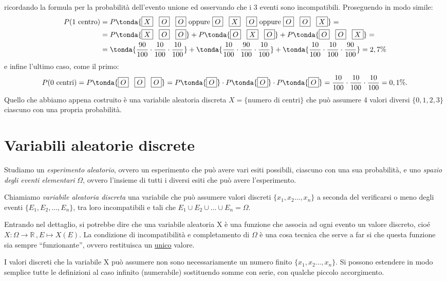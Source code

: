  ricordando la formula per la probabilità dell'evento unione ed osservando che i 3 eventi sono incompatibili. Proseguendo in modo simile:
 \[ \begin{split} P(\text{1 centro})&= P\tonda{\text{\boxed{X} \, \boxed{O} \, \boxed{O}} \text{ oppure } \text{\boxed{O} \, \boxed{X} \, \boxed{O}} \text{ oppure } \text{\boxed{O} \, \boxed{O} \, \boxed{X}}} =\\ &= 
P\tonda{\text{\boxed{X} \, \boxed{O} \, \boxed{O}}} +P\tonda{\text{\boxed{O} \, \boxed{X} \, \boxed{O}}} + P\tonda{ \text{\boxed{O} \, \boxed{O} \, \boxed{X}}} =\\ &=
 \tonda{\dfrac{90}{100} \cdot \dfrac{10}{100}  \cdot \dfrac{10}{100}}+ \tonda{\dfrac{10}{100} \cdot \dfrac{90}{100}  \cdot \dfrac{10}{100}}+ \tonda{\dfrac{10}{100} \cdot \dfrac{10}{100}  \cdot \dfrac{90}{100} } = 2,7 \%  \end{split}\]
 e infine l'ultimo caso, come il primo:
\[ P(\text{0 centri})= P\tonda{\text{\boxed{O} \, \boxed{O} \, \boxed{O}}} = P \tonda{\text{\boxed{O}}} \cdot P \tonda{\text{\boxed{O}}} \cdot P \tonda{\text{\boxed{O}}} = \dfrac{10}{100} \cdot \dfrac{10}{100}  \cdot \dfrac{10}{100}   = 
0,1\%. \]
Quello che abbiamo appena costruito è una variabile aleatoria discreta \(X = \{\text{numero di centri}\}\) che può assumere 4 valori diversi \(\{0,1,2,3\}\) ciascuno con una propria probabilità.

\section{Variabili aleatorie discrete}
\label{sec:01_discrete}

Studiamo un \emph{esperimento aleatorio}, ovvero un esperimento che può avere vari esiti possibili, ciascuno con una sua probabilità, e uno \emph{spazio degli eventi elementari} \(\Omega\), ovvero l'insieme di tutti i diversi esiti che può avere l'esperimento.

\begin{definizione} Chiamiamo \emph{variabile aleatoria discreta} una variabile che può assumere valori discreti \(\{x_1,x_2\dots,x_n\}\) a seconda del verificarsi o meno degli eventi \(\{E_1, E_2,\dots, E_n\}\), tra loro incompatibili e tali che \(E_1 \cup E_2 \cup \dots \cup E_n = \Omega\).
\end{definizione}

Entrando nel dettaglio, si potrebbe dire che una variabile aleatoria X è una funzione che associa ad ogni evento un valore discreto, cioé \(X:\Omega \longrightarrow \mathbb{R}\,, E \longmapsto X(E)\). La condizione di incompatibilità e completamento di \(\Omega\) è una cosa tecnica che serve a far si che questa funzione sia sempre ``funzionante'', ovvero restituisca \underline{} un \underline{unico} valore.
\begin{osservazione} I valori discreti che la variabile X può assumere non sono necessariamente un numero finito \(\{x_1,x_2\dots,x_n\}\). Si possono estendere in modo semplice tutte le definizioni al caso infinito (numerabile) sostituendo somme con serie, con qualche piccolo accorgimento.
\end{osservazione}

